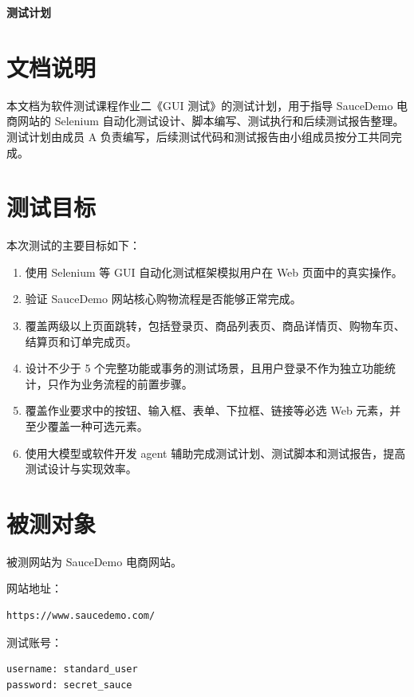 \documentclass[UTF8,a4paper,12pt]{ctexart}
\begin{document}
\begin{center}
  {\LARGE\bfseries 测试计划}
\end{center}
\thispagestyle{empty}
\vspace{1em}
\tableofcontents
\newpage

\section{文档说明}

本文档为软件测试课程作业二《GUI 测试》的测试计划，用于指导 SauceDemo 电商网站的 Selenium 自动化测试设计、脚本编写、测试执行和后续测试报告整理。测试计划由成员 A 负责编写，后续测试代码和测试报告由小组成员按分工共同完成。

\section{测试目标}

本次测试的主要目标如下：

\begin{enumerate}
  \item 使用 Selenium 等 GUI 自动化测试框架模拟用户在 Web 页面中的真实操作。
  \item 验证 SauceDemo 网站核心购物流程是否能够正常完成。
  \item 覆盖两级以上页面跳转，包括登录页、商品列表页、商品详情页、购物车页、结算页和订单完成页。
  \item 设计不少于 5 个完整功能或事务的测试场景，且用户登录不作为独立功能统计，只作为业务流程的前置步骤。
  \item 覆盖作业要求中的按钮、输入框、表单、下拉框、链接等必选 Web 元素，并至少覆盖一种可选元素。
  \item 使用大模型或软件开发 agent 辅助完成测试计划、测试脚本和测试报告，提高测试设计与实现效率。
\end{enumerate}

\section{被测对象}

被测网站为 SauceDemo 电商网站。

网站地址：

\begin{lstlisting}
https://www.saucedemo.com/
\end{lstlisting}

测试账号：

\begin{lstlisting}
username: standard_user
password: secret_sauce
\end{lstlisting}
\end{document}
